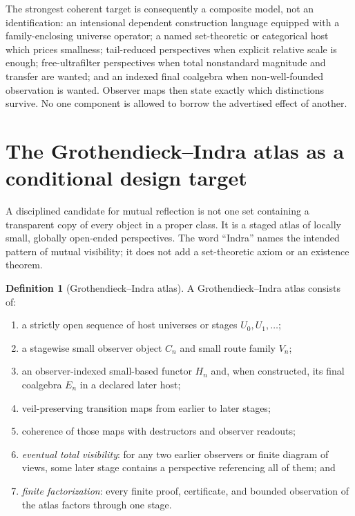 \documentclass[11pt]{article}
\theoremstyle{definition}
\newtheorem{definition}[theorem]{Definition}
\theoremstyle{remark}
\begin{document}
The strongest coherent target is consequently a composite model, not an
identification: an intensional dependent construction language equipped with a
family-enclosing universe operator; a named set-theoretic or categorical host
which prices smallness; tail-reduced perspectives when explicit relative scale
is enough; free-ultrafilter perspectives when total nonstandard magnitude and
transfer are wanted; and an indexed final coalgebra when non-well-founded
observation is wanted.  Observer maps then state exactly which distinctions
survive.  No one component is allowed to borrow the advertised effect of
another.

\section{The Grothendieck--Indra atlas as a conditional design target}

A disciplined candidate for mutual reflection is not one set containing a
transparent copy of every object in a proper class.  It is a staged atlas of
locally small, globally open-ended perspectives.  The word ``Indra'' names the
intended pattern of mutual visibility; it does not add a set-theoretic axiom or
an existence theorem.

\begin{definition}[Grothendieck--Indra atlas]
A Grothendieck--Indra atlas consists of:
\begin{enumerate}[label=(\alph*)]
\item a strictly open sequence of host universes or stages $U_0,U_1,\ldots$;
\item a stagewise small observer object $C_n$ and small route family $V_n$;
\item an observer-indexed small-based functor $H_n$ and, when constructed, its
  final coalgebra $E_n$ in a declared later host;
\item veil-preserving transition maps from earlier to later stages;
\item coherence of those maps with destructors and observer readouts;
\item \emph{eventual total visibility}: for any two earlier observers or finite
  diagram of views, some later stage contains a perspective referencing all of
  them; and
\item \emph{finite factorization}: every finite proof, certificate, and bounded
  observation of the atlas factors through one stage.
\end{enumerate}
\end{definition}
\end{document}
